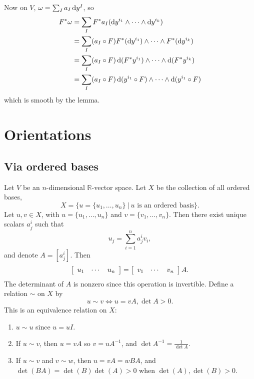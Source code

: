 \begin{enumerate}
{    Now on $V$, $\omega = \sum_I a_I \mathop{}\!\mathrm{d} y^I$, so
    \begin{align*}
       F^\ast \omega
    &= \sum_I
         F^\ast a_I
         (\dif y^{i_1} \wedge \cdots \wedge \dif y^{i_k}) \\
    &= \sum_I
         (a_I \circ F)
         F^\ast(\dif y^{i_1}) \wedge \cdots \wedge F^\ast(\dif
      y^{i_k}) \\
    &= \sum_I
         (a_I \circ F)
         \dif(F^\ast y^{i_1})
         \wedge \cdots \wedge
         \dif(F^\ast y^{i_k}) \\
    &= \sum_I
         (a_I \circ F)
         \dif(y^{i_1} \circ F)
         \wedge \cdots \wedge
         \dif(y^{i_1} \circ F)
    \end{align*}
    which is smooth by the lemma.
  }
\end{enumerate}

\section{Orientations}

\subsection{Via ordered bases}
Let $V$ be an $n$-dimensional $\mathbb{R}$-vector space. Let
$X$ be the collection of all ordered bases,
$$
  X
= \{ u = \{ u_1, \dots, u_n \} ~\vert~ \text{$u$ is an ordered basis} \}.
$$
Let $u, v \in X$, with $u = \{u_1, \dots, u_n\}$ and
$v = \{v_1, \dots, v_n\}$. Then there exist unique scalars $a^i_j$
such that
$$
u_j = \sum_{i=1}^n a^i_j v_i,
$$
and denote $A = [a_j^i]$. Then
$$
  \left[
    \begin{array}{c c c}
      u_1 & \cdots & u_n
    \end{array}
  \right]
=
  \left[
    \begin{array}{c c c}
      v_1 & \cdots & v_n
    \end{array}
  \right]
  A.
$$
The determinant of $A$ is nonzero since this operation is
invertible. Define a relation $\sim$ on $X$ by
$$
u \sim v \iff u = vA, \det A > 0.
$$
This is an equivalence relation on $X$:
\begin{enumerate}
  \item{
    $u \sim u$ since $u = uI$.
  }
  \item{
    If $u \sim v$, then $u = vA$ so
    $v = uA^{-1}$, and $\det A^{-1} = \frac{1}{\det A}$.
  }
  \item{
    If $u \sim v$ and $v \sim w$, then
    $u = vA = wBA$, and $\det(BA) = \det(B)\det(A) > 0$ when
    $\det(A), \det(B) > 0$.
  }
\end{enumerate}

